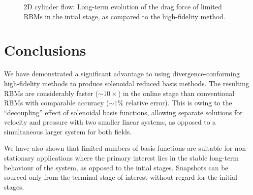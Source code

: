 \documentclass[a4paper]{jpconf}
\begin{document}
\begin{figure}
  \begin{center}
  \end{center}
  \caption{
    2D cylinder flow: Long-term evolution of the drag force of limited
    RBMs in the intial stage, as compared to the high-fidelity method.
  }
  \label{fig:initial}
\end{figure}

\section{Conclusions}

We have demonstrated a significant advantage to using
divergence-conforming high-fidelity methods to produce solenoidal
reduced basis methods.  The resulting RBMs are considerably faster
($\sim 10 \times $) in the online stage than conventional RBMs with
comparable accuracy ($\sim 1 \%$ relative error).  This is owing to
the ``decoupling'' effect of solenoidal basis functions, allowing
separate solutions for velocity and pressure with two smaller linear
systems, as opposed to a simultaneous larger system for both fields.

We have also shown that limited numbers of basis functions are
suitable for non-stationary applications where the primary interest
lies in the stable long-term behaviour of the system, as opposed to
the intial stages.  Snapshots can be sourced only from the terminal
stage of interest without regard for the initial stages.
\end{document}
